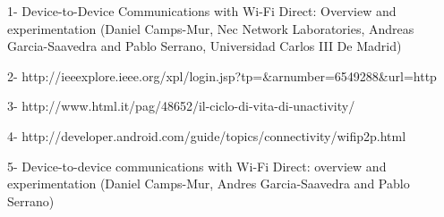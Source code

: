 1- Device-to-Device Communications with Wi-Fi Direct: Overview and
   experimentation (Daniel Camps-Mur, Nec Network Laboratories, Andreas
   Garcia-Saavedra and Pablo Serrano, Universidad Carlos III De Madrid)
   
2- http://ieeexplore.ieee.org/xpl/login.jsp?tp=&arnumber=6549288&url=http%

3- http://www.html.it/pag/48652/il-ciclo-di-vita-di-unactivity/

4- http://developer.android.com/guide/topics/connectivity/wifip2p.html

5- Device-to-device communications with Wi-Fi Direct: overview and
   experimentation (Daniel Camps-Mur, Andres Garcia-Saavedra and Pablo          Serrano)
   
